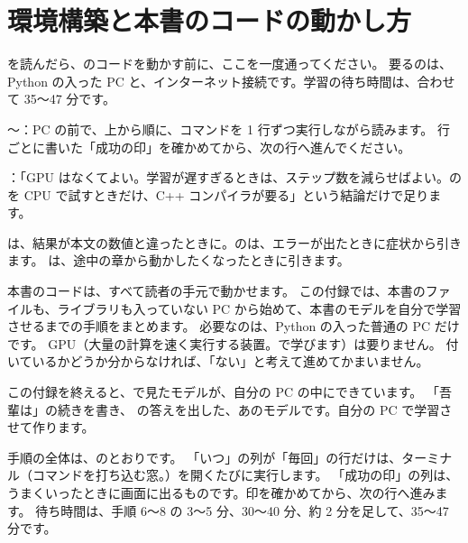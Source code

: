 \chapter{環境構築と本書のコードの動かし方}\label{app:setup}

\begin{readingguide}
\item[\rgpre] を読んだら、のコードを動かす前に、ここを一度通ってください。
  要るのは、Python の入った PC と、インターネット接続です。学習の待ち時間は、合わせて 35〜47 分です。
\item[\rgmust] 〜：PC の前で、上から順に、コマンドを 1 行ずつ実行しながら読みます。
  行ごとに書いた「成功の印」を確かめてから、次の行へ進んでください。
\item[\rgskim] ：「GPU はなくてよい。学習が遅すぎるときは、ステップ数を減らせばよい。の  を CPU で試すときだけ、C++ コンパイラが要る」という結論だけで足ります。
\item[\rglater] は、結果が本文の数値と違ったときに。のは、エラーが出たときに症状から引きます。
  は、途中の章から動かしたくなったときに引きます。
\end{readingguide}

本書のコードは、すべて読者の手元で動かせます。
この付録では、本書のファイルも、ライブラリも入っていない PC から始めて、本書のモデルを自分で学習させるまでの手順をまとめます。
必要なのは、Python の入った普通の PC だけです。
GPU（大量の計算を速く実行する装置。で学びます）は要りません。
付いているかどうか分からなければ、「ない」と考えて進めてかまいません。

この付録を終えると、で見たモデルが、自分の PC の中にできています。
「吾輩は」の続きを書き、 の答えを出した、あのモデルです。自分の PC で学習させて作ります。

手順の全体は、のとおりです。
「いつ」の列が「毎回」の行だけは、ターミナル（コマンドを打ち込む窓。）を開くたびに実行します。
「成功の印」の列は、うまくいったときに画面に出るものです。印を確かめてから、次の行へ進みます。
待ち時間は、手順 6〜8 の 3〜5 分、30〜40 分、約 2 分を足して、35〜47 分です。

